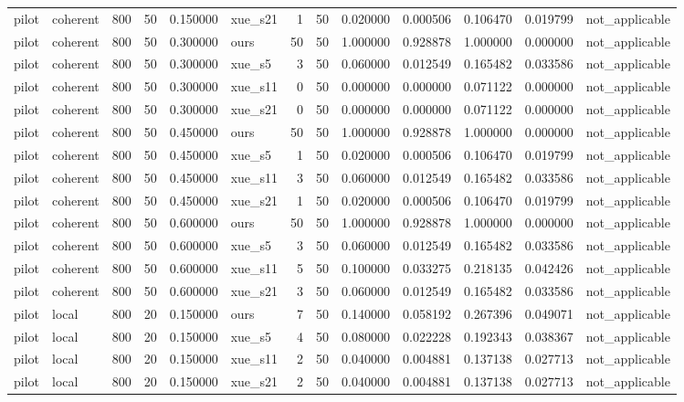 \begin{longtable}{llrrrlrrrrrrl}
pilot & coherent & 800 & 50 & 0.150000 & xue\_s21 & 1 & 50 & 0.020000 & 0.000506 & 0.106470 & 0.019799 & not\_applicable \\
pilot & coherent & 800 & 50 & 0.300000 & ours & 50 & 50 & 1.000000 & 0.928878 & 1.000000 & 0.000000 & not\_applicable \\
pilot & coherent & 800 & 50 & 0.300000 & xue\_s5 & 3 & 50 & 0.060000 & 0.012549 & 0.165482 & 0.033586 & not\_applicable \\
pilot & coherent & 800 & 50 & 0.300000 & xue\_s11 & 0 & 50 & 0.000000 & 0.000000 & 0.071122 & 0.000000 & not\_applicable \\
pilot & coherent & 800 & 50 & 0.300000 & xue\_s21 & 0 & 50 & 0.000000 & 0.000000 & 0.071122 & 0.000000 & not\_applicable \\
pilot & coherent & 800 & 50 & 0.450000 & ours & 50 & 50 & 1.000000 & 0.928878 & 1.000000 & 0.000000 & not\_applicable \\
pilot & coherent & 800 & 50 & 0.450000 & xue\_s5 & 1 & 50 & 0.020000 & 0.000506 & 0.106470 & 0.019799 & not\_applicable \\
pilot & coherent & 800 & 50 & 0.450000 & xue\_s11 & 3 & 50 & 0.060000 & 0.012549 & 0.165482 & 0.033586 & not\_applicable \\
pilot & coherent & 800 & 50 & 0.450000 & xue\_s21 & 1 & 50 & 0.020000 & 0.000506 & 0.106470 & 0.019799 & not\_applicable \\
pilot & coherent & 800 & 50 & 0.600000 & ours & 50 & 50 & 1.000000 & 0.928878 & 1.000000 & 0.000000 & not\_applicable \\
pilot & coherent & 800 & 50 & 0.600000 & xue\_s5 & 3 & 50 & 0.060000 & 0.012549 & 0.165482 & 0.033586 & not\_applicable \\
pilot & coherent & 800 & 50 & 0.600000 & xue\_s11 & 5 & 50 & 0.100000 & 0.033275 & 0.218135 & 0.042426 & not\_applicable \\
pilot & coherent & 800 & 50 & 0.600000 & xue\_s21 & 3 & 50 & 0.060000 & 0.012549 & 0.165482 & 0.033586 & not\_applicable \\
pilot & local & 800 & 20 & 0.150000 & ours & 7 & 50 & 0.140000 & 0.058192 & 0.267396 & 0.049071 & not\_applicable \\
pilot & local & 800 & 20 & 0.150000 & xue\_s5 & 4 & 50 & 0.080000 & 0.022228 & 0.192343 & 0.038367 & not\_applicable \\
pilot & local & 800 & 20 & 0.150000 & xue\_s11 & 2 & 50 & 0.040000 & 0.004881 & 0.137138 & 0.027713 & not\_applicable \\
pilot & local & 800 & 20 & 0.150000 & xue\_s21 & 2 & 50 & 0.040000 & 0.004881 & 0.137138 & 0.027713 & not\_applicable \\

\end{longtable}
